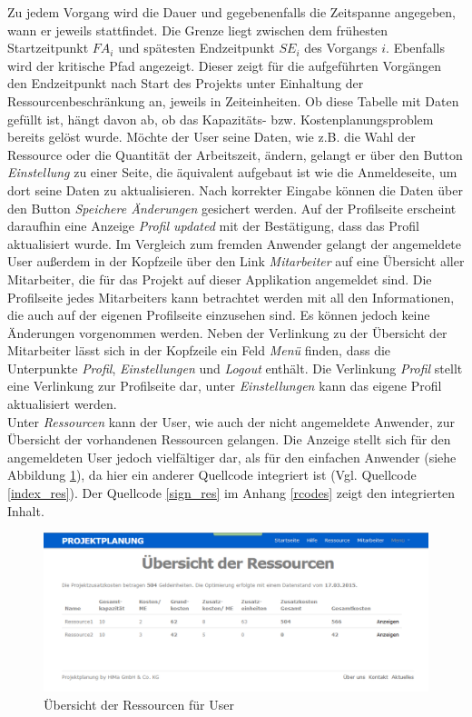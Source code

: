 \documentclass[a4paper,12pt,parskip,bibtotoc,liststotoc]{article}
\begin{document}
Zu jedem Vorgang wird die Dauer und gegebenenfalls die Zeitspanne angegeben, wann er jeweils stattfindet. Die Grenze liegt zwischen dem frühesten Startzeitpunkt $FA_{i}$ und spätesten Endzeitpunkt $SE_{i}$ des Vorgangs $i$. Ebenfalls wird der kritische Pfad angezeigt. Dieser zeigt für die aufgeführten Vorgängen den Endzeitpunkt nach Start des Projekts unter Einhaltung der Ressourcenbeschränkung an, jeweils in Zeiteinheiten. Ob diese Tabelle mit Daten gefüllt ist, hängt davon ab, ob das Kapazitäts- bzw. Kostenplanungsproblem bereits gelöst wurde. Möchte der User seine Daten, wie z.B. die Wahl der Ressource oder die Quantität der Arbeitszeit, ändern, gelangt er über den Button \textit{Einstellung} zu einer Seite, die äquivalent aufgebaut ist wie die Anmeldeseite, um dort seine Daten zu aktualisieren. Nach korrekter Eingabe können die Daten über den Button \textit{Speichere Änderungen} gesichert werden. Auf der Profilseite erscheint daraufhin eine Anzeige \textit{Profil updated} mit der Bestätigung, dass das Profil aktualisiert wurde. Im Vergleich zum fremden Anwender gelangt der angemeldete User außerdem in der Kopfzeile über den Link \textit{Mitarbeiter} auf eine Übersicht aller Mitarbeiter, die für das Projekt auf dieser Applikation angemeldet sind. Die Profilseite jedes Mitarbeiters kann betrachtet werden mit all den Informationen, die auch auf der eigenen Profilseite einzusehen sind. Es können jedoch keine Änderungen vorgenommen werden. Neben der Verlinkung zu der Übersicht der Mitarbeiter lässt sich in der Kopfzeile ein Feld \textit{Menü} finden, dass die Unterpunkte \textit{Profil}, \textit{Einstellungen} und \textit{Logout} enthält. Die Verlinkung \textit{Profil} stellt eine Verlinkung zur Profilseite dar, unter \textit{Einstellungen} kann das eigene Profil aktualisiert werden.\\

Unter \textit{Ressourcen} kann der User, wie auch der nicht angemeldete Anwender, zur Übersicht der vorhandenen Ressourcen gelangen. Die Anzeige stellt sich für den angemeldeten User jedoch vielfältiger dar, als für den einfachen Anwender (siehe Abbildung \ref{ResUs}), da hier ein anderer Quellcode integriert ist (Vgl. Quellcode \ref{index_res}). Der Quellcode \ref{sign_res} im Anhang \ref{rcodes} zeigt den integrierten Inhalt.\\

\begin{figure}[h!]
  \begin{center}
    \includegraphics[width=120mm]{Bilder/Ressourcen_User.png}
    \caption{Übersicht der Ressourcen für User}  \label{ResUs}
  \end{center}
\end{figure}
\end{document}
